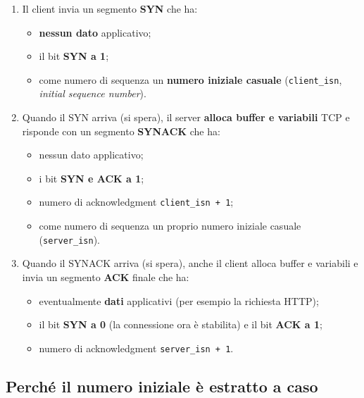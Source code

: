 \begin{enumerate}
    \item Il client invia un segmento \textbf{SYN} che ha:
    \begin{itemize}
      \item \textbf{nessun dato} applicativo;
      \item il bit \textbf{SYN a 1};
      \item come numero di sequenza un \textbf{numero iniziale casuale} (\texttt{client\_isn}, \emph{initial sequence number}).
    \end{itemize}
    \item Quando il SYN arriva (si spera), il server \textbf{alloca buffer e variabili} TCP e risponde con un segmento
          \textbf{SYNACK} che ha:
    \begin{itemize}
      \item nessun dato applicativo;
      \item i bit \textbf{SYN e ACK a 1};
      \item numero di acknowledgment \texttt{client\_isn + 1};
      \item come numero di sequenza un proprio numero iniziale casuale (\texttt{server\_isn}).
    \end{itemize}
    \item Quando il SYNACK arriva (si spera), anche il client alloca buffer e variabili e invia un segmento
          \textbf{ACK} finale che ha:
    \begin{itemize}
      \item eventualmente \textbf{dati} applicativi (per esempio la richiesta HTTP);
      \item il bit \textbf{SYN a 0} (la connessione ora è stabilita) e il bit \textbf{ACK a 1};
      \item numero di acknowledgment \texttt{server\_isn + 1}.
    \end{itemize}
\end{enumerate}


\subsection{Perché il numero iniziale è estratto a caso}

